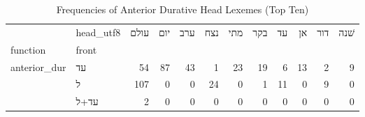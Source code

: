 \begin{table}[htbp!]
\centering
\caption{Frequencies of Anterior Durative Head Lexemes (Top Ten)}
\label{table:antdurheads_ct}
\begin{tabular}{llrrrrrrrrrr}
\toprule
             & head\_utf8 &  עולם &  יום &  ערב &  נצח &  מתי &  בקר &  עד &  אן &  דור &  שׁנה \\
function & front &       &      &      &      &      &      &     &     &      &       \\
\midrule
anterior\_dur & עד &    54 &   87 &   43 &    1 &   23 &   19 &   6 &  13 &    2 &     9 \\
             & ל &   107 &    0 &    0 &   24 &    0 &    1 &  11 &   0 &    9 &     0 \\
             & עד+ל &     2 &    0 &    0 &    0 &    0 &    0 &   0 &   0 &    0 &     0 \\
\bottomrule
\end{tabular}
\end{table}

